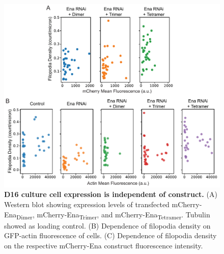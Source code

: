 \begin{figure}
\centering
\includegraphics[width=5in]{img/ch02/Supp_Figure_3_PNAS.pdf}
\caption[D16 culture cell expression is independent of construct.]{\textbf{D16 culture cell expression is independent of construct.} (A) Western blot showing expression levels of transfected mCherry-Ena\textsubscript{Dimer}, mCherry-Ena\textsubscript{Trimer}, and mCherry-Ena\textsubscript{Tetramer}. Tubulin showed as loading control. (B) Dependence of filopodia density on GFP-actin fluorescence of cells. (C) Dependence of filopodia density on the respective mCherry-Ena construct fluorescence intensity.}
\label{fig:ena-expression}
\end{figure}

